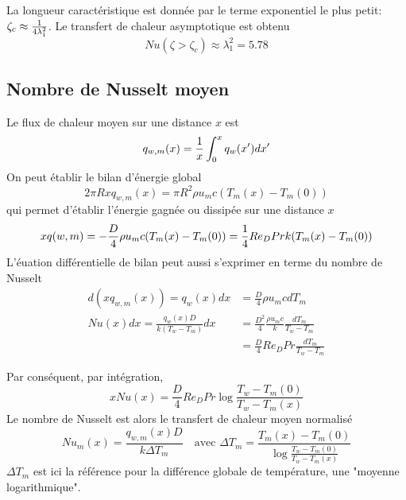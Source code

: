       La longueur caractéristique est donnée par le terme exponentiel le plus petit: $\zeta_c \approx \frac{1}{4 \lambda_1^2}$. Le transfert de chaleur asymptotique est obtenu
      \begin{equation}
        Nu(\zeta > \zeta_c) \approx \lambda_1^2 = 5.78
      \end{equation}

    \subsection{Nombre de Nusselt moyen}
      Le flux de chaleur moyen sur une distance $x$ est
      \begin{equation}
        q_{w,m} (x) = \frac{1}{x} \int_0^x q_w(x') dx'
      \end{equation}
      On peut établir le bilan d'énergie global
      \begin{equation}
        2\pi R x q_{w, m}(x) = \pi R^2 \rho u_m c (T_m(x) - T_m(0))
      \end{equation}
      qui permet d'établir l'énergie gagnée ou dissipée sur une distance $x$
      \begin{equation}
          x q(w, m) = - \frac{D}{4} \rho u_m c (T_m(x) - T_m(0)) = \frac{1}{4}Re_D Pr k (T_m(x) - T_m(0))
      \end{equation}
      L'éuation différentielle de bilan peut aussi s'exprimer en terme du nombre de Nusselt
      \begin{equation}
        \begin{aligned}
          d(x q_{w,m}(x)) = q_w(x) dx &= \frac{D}{4} \rho u_m c dT_m\\
          Nu(x)dx = \frac{q_w(x) D}{k (T_w - T_m)} dx &= \frac{D^2}{4} \frac{\rho u_m c}{k} \frac{dT_m}{T_w - T_m}\\
          &= \frac{D}{4} Re_D Pr \frac{dT_m}{T_w - T_m}
        \end{aligned}
      \end{equation}

      Par conséquent, par intégration,
      \begin{equation}
        x Nu(x) = \frac{D}{4} Re_D Pr \log\frac{T_w - T_m(0)}{T_w - T_m(x)}
      \end{equation}
      Le nombre de Nusselt est alors le transfert de chaleur moyen normalisé
      \begin{equation}
        Nu_m(x) = \frac{q_{w,m}(x) D}{k \Delta T_m} \quad \textrm{avec } \Delta T_m = \frac{T_m(x) - T_m(0)}{\log \frac{T_w - T_m(0)}{T_w - T_m(x)}}
      \end{equation}
      $\Delta T_m$ est ici la référence pour la différence globale de température, une "moyenne logarithmique".
